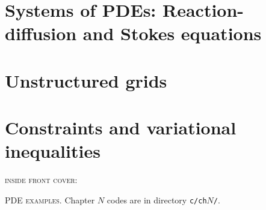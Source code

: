 \documentclass{tufte-book}
\newcommand{\CODELOC}{}  %
\newcommand{\stubinput}[2]{}
\newcommand{\stubinput}[2]{\vspace{5cm} \centerline{\LARGE Percent completed:  \Huge #2\%.} \vfill}
\theoremstyle{definition}
\begin{document}
\chapter{Systems of PDEs: Reaction-diffusion and Stokes equations}
\label{chap:sy}
\renewcommand{\CODELOC}{ch10/}


\chapter{Unstructured grids}
\label{chap:dp}
\renewcommand{\CODELOC}{ch11/}
\stubinput{chaps/dmplex.tex}{0}

\chapter{Constraints and variational inequalities}
\label{chap:co}
\renewcommand{\CODELOC}{ch12/}
\stubinput{chaps/constrained.tex}{20}
%


\backmatter




\clearpage

\newcommand{\tblockeqncode}[3]{
\begin{tabular}[t]{l} #1 \\ \quad {\normalsize \texttt{#3}} \\ \qquad \fbox{\small #2} \end{tabular}
}
\newcommand{\tblockcode}[2]{
\begin{tabular}[t]{l} #1 \\ \quad {\normalsize \texttt{#2}} \end{tabular}
}
\newcommand{\tblock}[1]{
\begin{tabular}[t]{l} #1 \end{tabular}
}

\clearpage
\thispagestyle{empty}
\noindent \textsc{inside front cover:}

\vfill
{\large \noindent \textsc{PDE examples}.} \quad Chapter $N$ codes are in directory \texttt{c/ch}$N$\texttt{/}.
\end{document}
